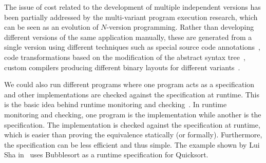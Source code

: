 The issue of cost related to the development of multiple independent versions
has been partially addressed by the multi-variant program execution research,
which can be seen as an evolution of $N$-version programming. Rather than
developing different versions of the same application manually, these are
generated from a single version using different techniques such as special
source code annotations~\cite{onlinevalidation,trachsel10}, code
transformations based on the modification of the abstract syntax
tree~\cite{schulte14,sosie:issta14}, custom compilers producing different
binary layouts for different variants~\cite{orchestra09,unibus:nspw10}.

We could also run different programs where one program acts as a specification
and other implementations are checked against the specification at runtime.
This is the basic idea behind runtime monitoring and
checking~\cite{kim:mac,java-mac01}. In runtime monitoring and checking, one
program is the implementation while another is the specification. The
implementation is checked against the specification at runtime, which is easier
than proving the equivalence statically (or formally).  Furthermore, the
specification can be less efficient and thus simple. The example shown by Lui
Sha in~\cite{lui01} uses Bubblesort as a runtime specification for Quicksort.





